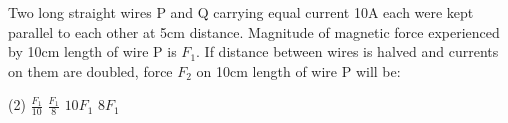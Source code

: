 \item Two long straight wires P and Q carrying equal current 10A each were kept parallel to each other at 5cm distance. Magnitude of magnetic force experienced by 10cm length of wire P is \(F_1\). If distance between wires is halved and currents on them are doubled, force \(F_2\) on 10cm length of wire P will be:
    \begin{tasks}(2)
        \task \(\frac{F_1}{10}\)
        \task \(\frac{F_1}{8}\)
        \task \(10F_1\)
        \task \(8F_1\)
    \end{tasks}